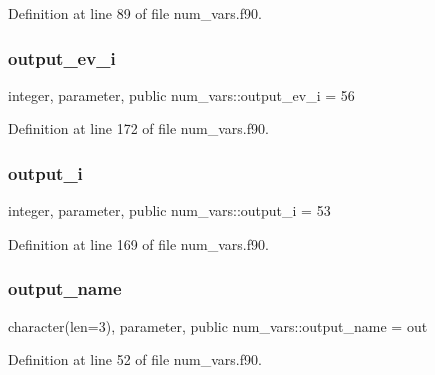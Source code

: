Definition at line 89 of file num\+\_\+vars.\+f90.

\mbox{\label{namespacenum__vars_a98774008e1bfbed335a89f813c7dcbde}} 
\subsubsection{\texorpdfstring{output\+\_\+ev\+\_\+i}{output\_ev\_i}}
{\footnotesize\ttfamily integer, parameter, public num\+\_\+vars\+::output\+\_\+ev\+\_\+i = 56}



Definition at line 172 of file num\+\_\+vars.\+f90.

\mbox{\label{namespacenum__vars_aec5ffb30114a8af11226208844d12998}} 
\subsubsection{\texorpdfstring{output\+\_\+i}{output\_i}}
{\footnotesize\ttfamily integer, parameter, public num\+\_\+vars\+::output\+\_\+i = 53}



Definition at line 169 of file num\+\_\+vars.\+f90.

\mbox{\label{namespacenum__vars_a0fbc4b8f8965e85d6cb1b1f7894ab698}} 
\subsubsection{\texorpdfstring{output\+\_\+name}{output\_name}}
{\footnotesize\ttfamily character(len=3), parameter, public num\+\_\+vars\+::output\+\_\+name = \textquotesingle{}out\textquotesingle{}}



Definition at line 52 of file num\+\_\+vars.\+f90.

\mbox{\label{namespacenum__vars_aa59942bdbb47a383030d0bcc21e1a3c0}} 
